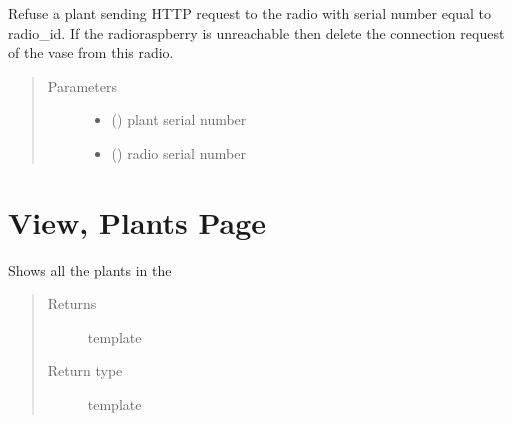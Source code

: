 \documentclass[letterpaper,10pt,english]{sphinxmanual}
\begin{document}

\begin{fulllineitems}
\label{\detokenize{index:view.connections.refuse_plant_from_conn}}
Refuse a plant sending HTTP request to the radio with serial number equal to radio\_id.
If the radio\sphinxhyphen{}raspberry is unreachable then delete the connection request of the vase from this radio.
\begin{quote}\begin{description}
\item[{Parameters}] \leavevmode\begin{itemize}
\item {} 
 () \textendash{} plant serial number

\item {} 
 () \textendash{} radio serial number

\end{itemize}

\end{description}\end{quote}

\end{fulllineitems}



\chapter{View, Plants Page}
\label{\detokenize{index:module-view.plants}}\label{\detokenize{index:view-plants-page}}

\begin{fulllineitems}
\label{\detokenize{index:view.plants.plants}}
Shows all the plants in the 
\begin{quote}\begin{description}
\item[{Returns}] \leavevmode
template 

\item[{Return type}] \leavevmode
template

\end{description}\end{quote}

\end{fulllineitems}
\end{document}
